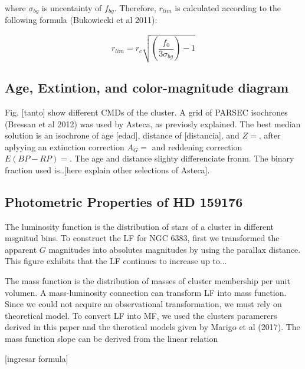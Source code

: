 \documentclass[fleqn,usenatbib,usedcolumn,useAMS]{mnras}
\begin{document}
where $\sigma_{bg}$ is uncentainty of $f_{bg}$. Therefore, $r_{lim}$ is calculated according to the following formula (Bukowiecki et al 2011):

\begin{equation*}
	r_{lim} = r_c \sqrt{\left(  \frac{f_0}{3\sigma_{bg}} \right) - 1}
\end{equation*}



\subsection{Age, Extintion, and color-magnitude diagram}

Fig. [tanto] show different CMDs of the cluster. A grid of PARSEC isochrones (Bressan et al 2012) was used by Asteca, as previosly explained. The best median solution is an isochrone of age [edad], distance of [distancia], and $Z =$, after aplyying an extinction correction $A_G =$ and reddening correction $E(BP-RP) = $. The age and distance slighty differenciate fronm. The binary fraction used  is..[here explain other selections of Asteca]. 
 
 

\subsection{Photometric Properties of HD 159176}
The luminosity function is the distribution of stars of a cluster in different msgnitud bins. To construct the LF for NGC 6383, first we transformed the apparent $G$ magnitudes into absolutes magnitudes by using the parallax distance. This figure exhibits that the LF continues to increase up to... 

The mass function is the distribution of masses of cluster membership per unit volumen. A mass-luminosity connection can transform LF into mass function. Since we could not acquire an observational transformation, we must rely on theoretical model. To convert LF into MF, we used the clusters paramerers derived in this paper and the therotical models given by Marigo et al (2017). The mass function slope can be derived from the linear relation

[ingresar formula]

\end{document}
